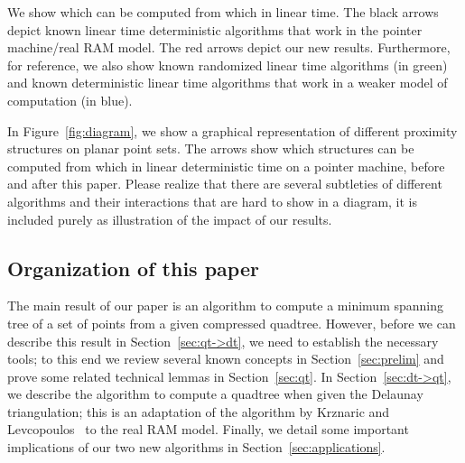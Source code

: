 \documentclass[11pt]{paper}
\begin{document}
    { We show which can be computed from which in linear time. The black
      arrows depict known linear time deterministic algorithms that work
      in the pointer machine/real RAM model. The red arrows depict our
      new results. Furthermore, for reference, we also show known 
      randomized linear time algorithms (in green) and known deterministic
      linear time algorithms that work in a weaker model of computation 
      (in blue).
    }

    In Figure~\ref {fig:diagram}, we show a graphical representation of 
    different proximity structures on planar point sets.
    The arrows show which structures can be computed from which in
    linear deterministic time on a pointer machine, before and after
    this paper.
    Please realize that there are several subtleties of different 
    algorithms and their interactions that are hard to show in a
    diagram, it is included purely as illustration of the impact of 
    our results.


  \subsection {Organization of this paper}
  
    The main result of our paper is an algorithm to compute a minimum spanning
    tree of a set of points from a given compressed quadtree. However, before
    we can describe this result in Section~\ref {sec:qt->dt}, we need to
    establish the necessary tools; to this end we review several known
    concepts in Section~\ref {sec:prelim} and prove some related technical
    lemmas in Section~\ref {sec:qt}.
    In Section~\ref {sec:dt->qt}, we describe the algorithm to compute a
    quadtree when given the Delaunay triangulation; this is an adaptation
    of the algorithm by Krznaric and Levcopoulos~\cite {KrznaricLe98} to the
    real RAM model.
    Finally, we detail some important implications of our two new algorithms
    in Section~\ref {sec:applications}.
  
  
\end{document}
